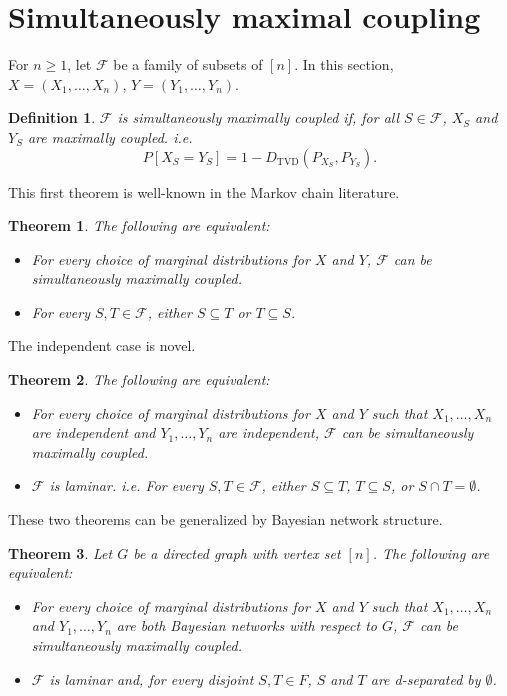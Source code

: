 \documentclass{article}
\newtheorem{theorem}{Theorem}
\newtheorem{definition}{Definition}
\newcommand{\F}{\mathcal{F}}
\begin{document}
\section{Simultaneously maximal coupling}

For $n \ge 1$, let \( \mathcal{F} \) be a family of subsets of \([n]\).
In this section, \( X = (X_1, \dots, X_n) \), \( Y = (Y_1, \dots, Y_n) \).

\begin{definition}
$\F$ is simultaneously maximally coupled if, for all $S \in \F$,
$X_S$ and $Y_S$ are maximally coupled. i.e.
\[
    P[X_S = Y_S] = 1 - D_{\text{TVD}}(P_{X_S}, P_{Y_S}).
\]
\end{definition}

This first theorem is well-known in the Markov chain literature.

\begin{theorem}
The following are equivalent:
\begin{itemize}
    \item For every choice of marginal distributions for $X$ and $Y$,
    $\F$ can be simultaneously maximally coupled.
    \item For every $S,T \in \F$, either $S \subseteq T$ or $T \subseteq S$.
\end{itemize}
\end{theorem}

The independent case is novel.

\begin{theorem}
\raggedright
The following are equivalent:
\begin{itemize}
    \item For every choice of marginal distributions for $X$ and $Y$
    such that $X_1, \dots, X_n$ are independent
    and $Y_1, \dots, Y_n$ are independent,
    $\F$ can be simultaneously maximally coupled.
    \item $\F$ is laminar. i.e. For every $S,T \in \F$, either $S \subseteq T$, $T \subseteq S$, or $S \cap T = \emptyset$.
\end{itemize}
\end{theorem}

These two theorems can be generalized by Bayesian network structure.

\begin{theorem}
\raggedright
Let $G$ be a directed graph with vertex set $[n]$. The following are equivalent:
\begin{itemize}
    \item For every choice of marginal distributions for $X$ and $Y$
    such that $X_1, \dots, X_n$ and
    $Y_1, \dots, Y_n$ are both Bayesian networks with respect to $G$,
    $\F$ can be simultaneously maximally coupled.
    \item $\F$ is laminar and, for every disjoint $S,T \in F$, $S$ and $T$ are d-separated by $\emptyset$.
\end{itemize}
\end{theorem}
\end{document}
